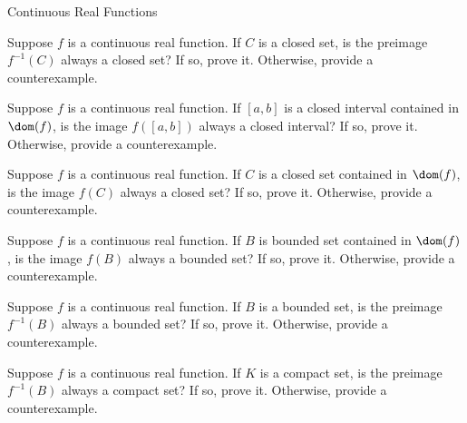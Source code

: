 \begin{section}{Continuous Real Functions}

\begin{problem}
Suppose $f$ is a continuous real function. If $C$ is a closed set, is the preimage $f^{-1}(C)$ always a closed set? If so, prove it.  Otherwise, provide a counterexample.
\end{problem}

\begin{problem}
Suppose $f$ is a continuous real function. If $[a,b]$ is a closed interval contained in $\dom(f)$, is the image $f([a,b])$ always a closed interval?  If so, prove it.  Otherwise, provide a counterexample.
\end{problem}

\begin{problem}
Suppose $f$ is a continuous real function. If $C$ is a closed set contained in $\dom(f)$, is the image $f(C)$ always a closed set?  If so, prove it.  Otherwise, provide a counterexample.
\end{problem}

\begin{problem}
Suppose $f$ is a continuous real function. If $B$ is bounded set contained in $\dom(f)$, is the image $f(B)$ always a bounded set?  If so, prove it.  Otherwise, provide a counterexample.
\end{problem}

\begin{problem}
Suppose $f$ is a continuous real function. If $B$ is a bounded set, is the preimage $f^{-1}(B)$ always a bounded set? If so, prove it.  Otherwise, provide a counterexample.
\end{problem}

\begin{problem}
Suppose $f$ is a continuous real function. If $K$ is a compact set, is the preimage $f^{-1}(B)$ always a compact set? If so, prove it.  Otherwise, provide a counterexample.
\end{problem}



\end{section}
